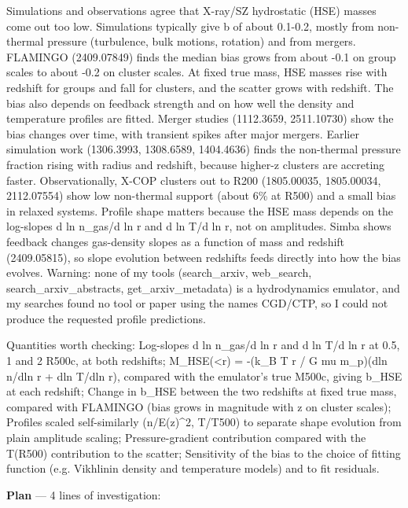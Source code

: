 \documentclass[11pt,a4paper]{article}
\begin{document}
Simulations and observations agree that X-ray/SZ hydrostatic (HSE) masses come out too low. Simulations typically give b of about 0.1-0.2, mostly from non-thermal pressure (turbulence, bulk motions, rotation) and from mergers. FLAMINGO (2409.07849) finds the median bias grows from about -0.1 on group scales to about -0.2 on cluster scales. At fixed true mass, HSE masses rise with redshift for groups and fall for clusters, and the scatter grows with redshift. The bias also depends on feedback strength and on how well the density and temperature profiles are fitted. Merger studies (1112.3659, 2511.10730) show the bias changes over time, with transient spikes after major mergers. Earlier simulation work (1306.3993, 1308.6589, 1404.4636) finds the non-thermal pressure fraction rising with radius and redshift, because higher-z clusters are accreting faster. Observationally, X-COP clusters out to R200 (1805.00035, 1805.00034, 2112.07554) show low non-thermal support (about 6\% at R500) and a small bias in relaxed systems. Profile shape matters because the HSE mass depends on the log-slopes d ln n\_gas/d ln r and d ln T/d ln r, not on amplitudes. Simba shows feedback changes gas-density slopes as a function of mass and redshift (2409.05815), so slope evolution between redshifts feeds directly into how the bias evolves. Warning: none of my tools (search\_arxiv, web\_search, search\_arxiv\_abstracts, get\_arxiv\_metadata) is a hydrodynamics emulator, and my searches found no tool or paper using the names CGD/CTP, so I could not produce the requested profile predictions.

Quantities worth checking: Log-slopes d ln n\_gas/d ln r and d ln T/d ln r at 0.5, 1 and 2 R500c, at both redshifts; M\_HSE(\textless{}r) = -(k\_B T r / G mu m\_p)(dln n/dln r + dln T/dln r), compared with the emulator's true M500c, giving b\_HSE at each redshift; Change in b\_HSE between the two redshifts at fixed true mass, compared with FLAMINGO (bias grows in magnitude with z on cluster scales); Profiles scaled self-similarly (n/E(z)\textasciicircum{}2, T/T500) to separate shape evolution from plain amplitude scaling; Pressure-gradient contribution compared with the T(R500) contribution to the scatter; Sensitivity of the bias to the choice of fitting function (e.g. Vikhlinin density and temperature models) and to fit residuals.

\textbf{Plan} --- 4 lines of investigation:
\end{document}
